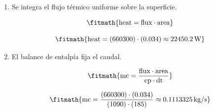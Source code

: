 \begin{enumerate}

\item Se integra el flujo térmico uniforme sobre la superficie.

\[\fitmath{\mathrm{heat}=\mathrm{flux}\cdot \mathrm{area}}\]

\[\fitmath{\mathrm{heat}=(660300)\cdot (0.034)\approx 22450.2\,\mathrm{W}}\]

\item El balance de entalpía fija el caudal.

\[\fitmath{\mathrm{mc}=\frac{\mathrm{flux}\cdot \mathrm{area}}{\mathrm{cp}\cdot \mathrm{dt}}}\]

\[\fitmath{\mathrm{mc}=\frac{(660300)\cdot (0.034)}{(1090)\cdot (185)}\approx 0.1113325\,\mathrm{kg/s}}\]

\end{enumerate}
